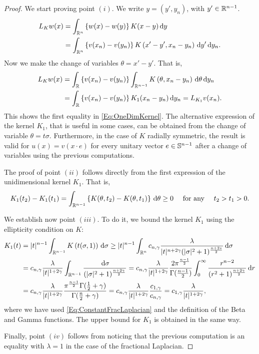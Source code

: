 \begin{proof}
	We start proving point $(i)$. We write $y=(y',y_n)$, with $y'\in \mathbb{R}^{n-1}$.
	\begin{align*}
	L_K w(x) &= \int_{\mathbb{R}^n} \left\{ w(x)-w(y) \right\} K(x-y) \,\mathrm{d} y \\
	&=\int_{\mathbb{R}^n} \left\{ v(x_n)-v(y_n) \right\} K\left(x'-y',x_n-y_n\right) \,\mathrm{d} y' \,\mathrm{d} y_n.
	\end{align*}
	Now we make the change of variables $\theta = x'-y'$. That is,
	\begin{align*}
	L_K w(x) 	&= \int_{\mathbb{R}} \left\{ v(x_n)-v(y_n) \right\} \int_{\mathbb{R}^{n-1}} K\left(\theta,x_n-y_n\right) \,\mathrm{d} \theta \,\mathrm{d} y_n \\
	&= \int_{\mathbb{R}} \left\{ v(x_n)-v(y_n) \right\} K_1(x_n-y_n ) \,\mathrm{d} y_n = L_{K_1}v(x_n).
	\end{align*}
	This shows the first equality in \eqref{Eq:OneDimKernel}. The alternative expression of the kernel $K_1$, that is useful in some cases, can be obtained from the change of variable $\theta = t\sigma$. Furthermore, in the case of $K$ radially symmetric, the result is valid for $u(x) = v(x\cdot e)$ for every unitary vector $e\in \mathbb{S}^{n-1}$ after a change of variables using the previous computations.
	
	The proof of point $(ii)$ follows directly from the first expression of the unidimensional kernel $K_1$. That is,
	$$ 
	K_1(t_2)-K_1(t_1) = \int_{\mathbb{R}^{n-1}} \left\{ K(\theta,t_2) - K(\theta,t_1)\right\} \,\mathrm{d} \theta \geq 0 \quad \text{ for any } \quad t_2>t_1>0. 
	$$
	
	We establish now point $(iii)$. To do it, we bound the kernel $K_1$ using the ellipticity condition on $K$:
	\begin{align*}
	K_1(t) &= |t|^{n-1} \int_{\mathbb{R}^{n-1}} K\left(t(\sigma,1)\right) \,\mathrm{d}\sigma \geq |t|^{n-1} \int_{\mathbb{R}^n} c_{n,\gamma} \frac{\lambda}{|t|^{n+2\gamma}(|\sigma|^2+1)^{\frac{n+2s}{2}}} \,\mathrm{d}\sigma \\
	&= c_{n,\gamma} \frac{\lambda}{|t|^{1+2\gamma}} \int_{\mathbb{R}^{n-1}} \frac{\,\mathrm{d}\sigma}{(|\sigma|^2+1)^{\frac{n+2\gamma}{2}}} = c_{n,\gamma} \frac{\lambda}{|t|^{1+2\gamma}} \dfrac{2 \pi^{\frac{n-1}{2}}}{\Gamma(\frac{n-1}{2})} \int_0^\infty \dfrac{r^{n-2}}{(r^2+1)^{\frac{n+2\gamma}{2}}} \,\mathrm{d} r \\	
	& = c_{n,\gamma} \frac{\lambda}{|t|^{1+2\gamma}} 
	\dfrac{\pi^{\frac{n-1}{2}} \Gamma(\frac{1}{2}+\gamma)}{\Gamma(\frac{n}{2}+\gamma)} 
	= c_{n,\gamma} \frac{\lambda}{|t|^{1+2\gamma}} \frac{c_{1,\gamma}}{c_{n,\gamma}} = c_{1,\gamma} \frac{\lambda}{|t|^{1+2\gamma}},
	\end{align*}
	where we have used \eqref{Eq:ConstantFracLaplacian} and the definition of the Beta and Gamma functions. The upper bound for $K_1$ is obtained in the same way.
	
	Finally, point $(iv)$ follows from noticing that the previous computation is an equality with $\lambda = 1$ in the case of the fractional Laplacian.
\end{proof}





